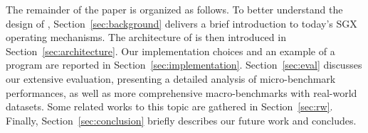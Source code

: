 The remainder of the paper is organized as follows.
To better understand the design of \SYS, Section~\ref{sec:background} delivers a brief introduction to today's SGX operating mechanisms.
The architecture of \SYS{} is then introduced in Section~\ref{sec:architecture}.
Our implementation choices and an example of a \SYS{} program are reported in Section~\ref{sec:implementation}.
Section~\ref{sec:eval} discusses our extensive evaluation, presenting a detailed analysis of micro-benchmark performances, as well as more comprehensive macro-benchmarks with real-world datasets.
Some related works to this topic are gathered in Section~\ref{sec:rw}.
Finally, Section~\ref{sec:conclusion} briefly describes our future work and concludes.
